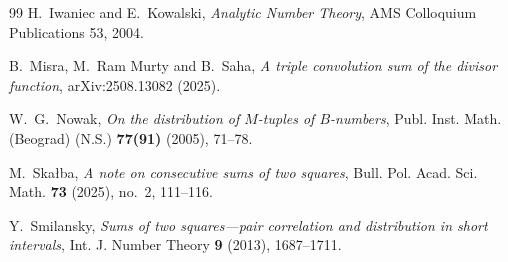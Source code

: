 \documentclass[11pt]{amsart}
\theoremstyle{remark}
\theoremstyle{definition}
\numberwithin{equation}{section}
\begin{document}
\begin{thebibliography}{99}
 H.~Iwaniec and E.~Kowalski, \emph{Analytic Number Theory}, AMS Colloquium Publications 53, 2004.

 B.~Misra, M.~Ram Murty and B.~Saha, \emph{A triple convolution sum of the divisor function}, arXiv:2508.13082 (2025).

 W.~G.~Nowak, \emph{On the distribution of $M$-tuples of $B$-numbers}, Publ. Inst. Math. (Beograd) (N.S.) \textbf{77(91)} (2005), 71--78.

 M.~Ska{\l}ba, \emph{A note on consecutive sums of two squares}, Bull. Pol. Acad. Sci. Math. \textbf{73} (2025), no.~2, 111--116.

 Y.~Smilansky, \emph{Sums of two squares---pair correlation and distribution in short intervals}, Int. J. Number Theory \textbf{9} (2013), 1687--1711.

\end{thebibliography}
\end{document}
